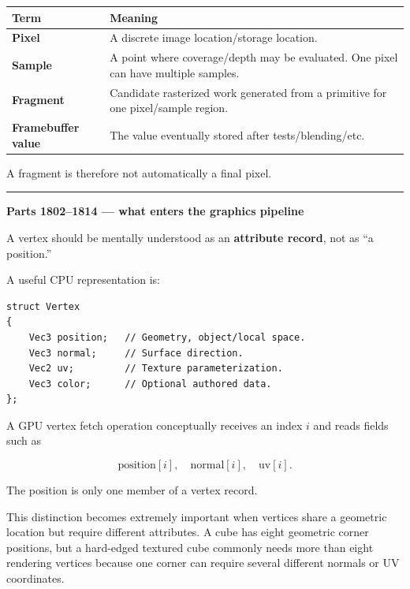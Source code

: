 {\def\LTcaptype{none} %
\begin{longtable}[]{@{}
  >{\raggedright\arraybackslash}p{}
  >{\raggedright\arraybackslash}p{}@{}}
\toprule\noalign{}
\begin{minipage}[b]{\linewidth}\raggedright
Term
\end{minipage} & \begin{minipage}[b]{\linewidth}\raggedright
Meaning
\end{minipage} \\
\midrule\noalign{}
\endhead
\bottomrule\noalign{}
\endlastfoot
\textbf{Pixel} & A discrete image location/storage location. \\
\textbf{Sample} & A point where coverage/depth may be evaluated. One pixel can have multiple samples. \\
\textbf{Fragment} & Candidate rasterized work generated from a primitive for one pixel/sample region. \\
\textbf{Framebuffer value} & The value eventually stored after tests/blending/etc. \\
\end{longtable}
}

A fragment is therefore not automatically a final pixel.

\begin{center}\rule{0.5\linewidth}{0.5pt}\end{center}

\textbf{Parts 1802--1814 --- what enters the graphics pipeline}

A vertex should be mentally understood as an \textbf{attribute record}, not as ``a position.''

A useful CPU representation is:

\begin{verbatim}
struct Vertex
{
    Vec3 position;   // Geometry, object/local space.
    Vec3 normal;     // Surface direction.
    Vec2 uv;         // Texture parameterization.
    Vec3 color;      // Optional authored data.
};
\end{verbatim}

A GPU vertex fetch operation conceptually receives an index \(i\) and reads fields such as

\[
\text{position}[i],\quad
\text{normal}[i],\quad
\text{uv}[i].
\]

The position is only one member of a vertex record.

This distinction becomes extremely important when vertices share a geometric location but require different attributes. A cube has eight geometric corner positions, but a hard-edged textured cube commonly needs more than eight rendering vertices because one corner can require several different normals or UV coordinates.


